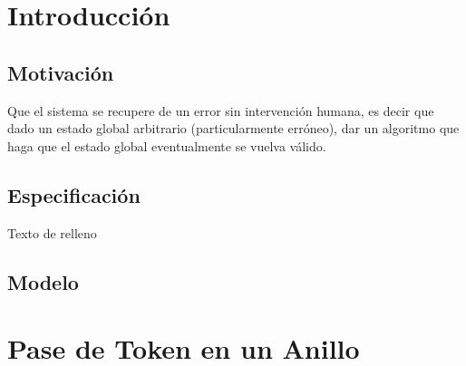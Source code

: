 \documentclass[12pt,a4paper]{article}
\begin{document}
\section{Introducción}{
\subsection{Motivación}{
    Que el sistema se recupere de un error sin intervención humana, es decir que
    dado un estado global arbitrario (particularmente erróneo), dar un algoritmo
    que haga que el estado global eventualmente se vuelva válido.
}
\subsection{Especificación}{
    Texto de relleno
}
\subsection{Modelo}{}
}
\section{Pase de Token en un Anillo}{}
\end{document}
